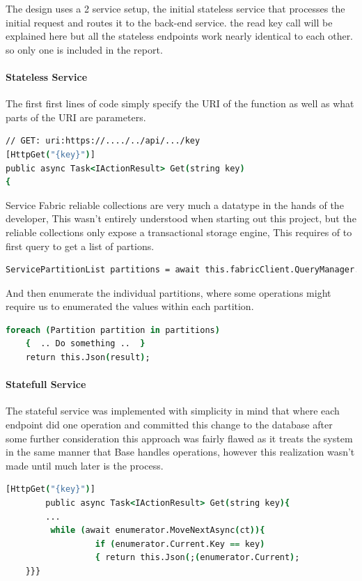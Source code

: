 \documentclass[a4paper,10pt,titlepage]{report}
\begin{document}
        
        The design uses a 2 service setup, the initial stateless service that processes the initial request and routes it to the back-end service. the read key call will be explained here but all the stateless endpoints work nearly identical to each other. so only one is included in the report.\\
        
        \paragraph{Stateless Service}
        The first first lines of code simply specify the URI of the function as well as what parts of the URI are parameters.
\begin{lstlisting}[language=csh]
// GET: uri:https://..../../api/.../key
[HttpGet("{key}")]
public async Task<IActionResult> Get(string key)
{
\end{lstlisting}   
Service Fabric reliable collections are very much a datatype in the hands of the developer, This wasn't entirely understood when starting out this project, but the reliable collections only expose a transactional storage engine, This requires of to first query to get a list of partions.
\begin{lstlisting}[language=csh]
    ServicePartitionList partitions = await this.fabricClient.QueryManager.GetPartitionListAsync(serviceName);
\end{lstlisting}   
And then enumerate the individual partitions, where some operations might require us to enumerated the values within each partition. 
\begin{lstlisting}[language=csh]
    foreach (Partition partition in partitions)
    {  .. Do something ..  }
    return this.Json(result);
\end{lstlisting}  

\paragraph{Statefull Service}

The stateful service was implemented with simplicity in mind that where each endpoint did one operation and committed this change to the database after some further consideration this approach was fairly flawed as it treats the system in the same manner that Base handles operations, however this realization wasn't made until much later is the process.

\begin{lstlisting}[language=csh]
        [HttpGet("{key}")]
        public async Task<IActionResult> Get(string key){
        ...
         while (await enumerator.MoveNextAsync(ct)){
                  if (enumerator.Current.Key == key)
                  { return this.Json(;(enumerator.Current);
    }}}
\end{lstlisting}   
\end{document}
